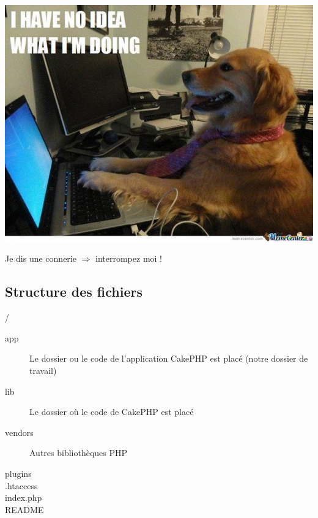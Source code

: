 \begin{frame}
\begin{center}
\includegraphics[scale=0.40]{img/noidea.jpg}

Je dis une connerie $\Rightarrow$ interrompez moi !
\end{center}
\end{frame}

\subsection{Structure des fichiers}

\begin{frame}{/}
\begin{description}
  \item [app] Le dossier ou le code de l'application CakePHP est placé (notre dossier de travail)
  \item [lib] Le dossier où le code de CakePHP est placé
  \item [vendors] Autres bibliothèques PHP
  \item [plugins]
  \item [.htaccess]
  \item [index.php]
  \item [README]
\end{description}
\end{frame}

